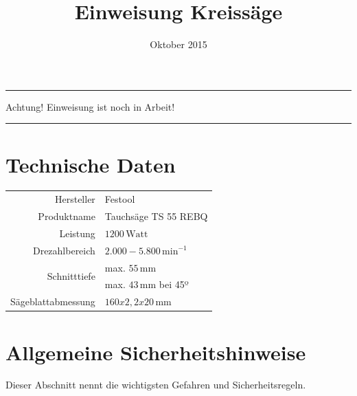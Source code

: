 \documentclass{\basedir/fablab-document}
\date{Oktober 2015}
\author{}
\title{Einweisung Kreissäge}
\begin{document}
\dosecttoc
\faketableofcontents
{}

\color{red}
\hrule
\begin{center}
\large{Achtung! Einweisung ist noch in Arbeit!}
\vspace{0.1cm}
\end{center}
\hrule
\color{black}

\section{Technische Daten}
\begin{tabular}{r|l}
Hersteller & Festool \\
Produktname & Tauchsäge TS 55 REBQ \\
Leistung & $1200\,\mathrm{Watt}$ \\
Drezahlbereich & $2.000 - 5.800\,\mathrm{min}^{-1}$ \\
\multirow{2}{*}{Schnitttiefe} & max. $55\,\mathrm{mm}$ \\
             & max. $43\,\mathrm{mm}$ bei 45º\\
Sägeblattabmessung & $160x2,2x20\,\mathrm{mm}$\\
\end{tabular}

\section[Allgemeine Sicherheitshinweise]{Allgemeine Sicherheitshinweise}

Dieser Abschnitt nennt die wichtigsten Gefahren und Sicherheitsregeln.
\end{document}
